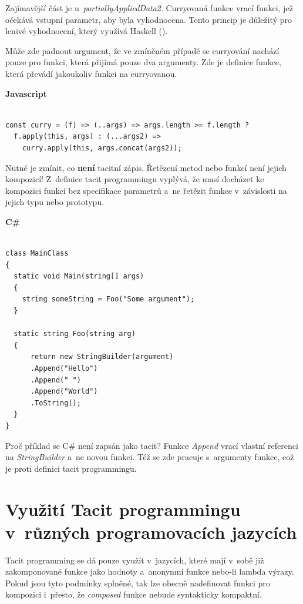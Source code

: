 \documentclass[male, czech]{kithesis}
\begin{document}
Zajímavější část je u~\textit{partiallyAppliedData2}. 
Curryovaná funkce vrací funkci, 
jež očekává vstupní parametr, 
aby byla vyhodnocena. 
Tento princip je důležitý
pro lenivé vyhodnocení, 
který využívá Haskell (\cite{HaskellCurrying}).

Může zde padnout argument, 
že ve zmíněném případě se curryování nachází pouze pro funkci,
která přijímá pouze dva argumenty. 
Zde je definice funkce, 
která převádí jakoukoliv funkci na curryovanou.

\textbf{Javascript}
\begin{verbatim}

const curry = (f) => (..args) => args.length >= f.length ? 
  f.apply(this, args) : (...args2) => 
    curry.apply(this, args.concat(args2));

\end{verbatim}

Nutné je zmínit, 
co \textbf{není} tacitní zápis. 
Řetězení metod nebo funkcí není jejich kompozicí!
Z~definice tacit programmingu vyplývá,
že musí docházet ke kompozici funkcí bez specifikace parametrů
a~ne řetězit funkce v~závislosti na jejich typu nebo prototypu.

\textbf{C\#}
\begin{verbatim}

class MainClass 
{
  static void Main(string[] args)
  {
    string someString = Foo("Some argument");
  }

  static string Foo(string arg)
  {
      return new StringBuilder(argument)
      .Append("Hello")
      .Append(" ")
      .Append("World")
      .ToString();
  }
}

\end{verbatim}

Proč příklad se C\# není zapsán jako tacit? 
Funkce \textit{Append} vrací vlastní referenci na \textit{StringBuilder}
a~ne novou funkci. 
Též se zde pracuje s~argumenty funkce, 
což je proti definici tacit programmingu.

\section{Využití Tacit programmingu v~různých programovacích jazycích}

Tacit programming se dá pouze využít v~jazycích,
které mají v~sobě již zakomponované funkce jako hodnoty
a~anonymní funkce nebo-li lambda výrazy.
Pokud jsou tyto podmínky splněné, 
tak lze obecně nadefinovat funkci pro kompozici i~přesto,
že \textit{composed} funkce nebude syntakticky kompaktní.
\end{document}
